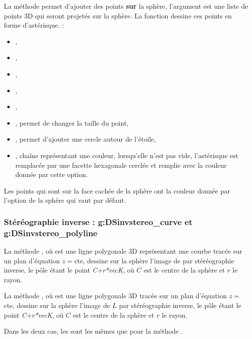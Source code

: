 La méthode  permet d'ajouter des points \textbf{sur} la sphère, l'argument  est une liste de points 3D qui seront projetés sur la sphère. La fonction dessine ces points en forme d'astérisque. \writeoptions :
    \begin{itemize}
        \item {}, 
        \item {},
        \item {},
        \item {},
        \item {},
        \item {}, permet de changer la taille du point,
        \item {}, permet d'ajouter une cercle autour de l'étoile,
        \item {}, chaîne représentant une couleur, lorsqu'elle n'est pas vide, l'astérisque est remplacée par une facette hexagonale cerclée et remplie avec la couleur donnée par cette option.
    \end{itemize}   
Les points qui sont sur la face cachée de la sphère ont la couleur donnée par l'option de la sphère  qui vaut  par défaut.

\subsubsection{Stéréographie inverse : g:DSinvstereo\_curve et g:DSinvstereo\_polyline}

La méthode , où  est une ligne polygonale 3D représentant une courbe tracée sur un plan d'équation $z=$cte, dessine sur la sphère l'image de  par stéréographie inverse, le pôle étant le point \emph{C+r*vecK}, où $C$ est le centre de la sphère et $r$ le rayon.

La méthode , où  est une ligne polygonale 3D tracée sur un plan d'équation $z=$cte, dessine sur la sphère l'image de $L$ par stéréographie inverse, le pôle étant le point \emph{C+r*vecK}, où $C$ est le centre de la sphère et $r$ le rayon.

Dans les deux cas, les  sont les mêmes que pour la méthode .

